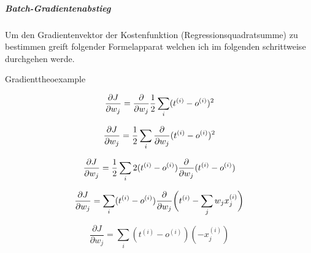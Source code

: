 \vspace{1cm}

\subparagraph{Batch-Gradientenabstieg}
Um den Gradientenvektor der Kostenfunktion (Regressionsquadratsumme) zu bestimmen greift folgender Formelapparat welchen ich im folgenden schrittweise durchgehen werde.

\vspace{2 mm}
\begin{minipage}{\textwidth}
\begin{myderivation}{Gradient}{theoexample} \label{deri:grad}

\begin{equation} \label{eq:gr1}
\frac{\partial J}{\partial w_j} = \frac{\partial }{\partial w_j} \frac{1}{2} \sum_i  (t^{(i)} - o^{(i)})^2 \\
\end{equation}

\begin{equation} \label{eq:gr2}
\frac{\partial J}{\partial w_j} = \frac{1}{2} \sum_i \frac{\partial }{\partial w_j} (t^{(i)} - o^{(i)})^2 \\
\end{equation}

\begin{equation} \label{eq:gr3}
\frac{\partial J}{\partial w_j} = \frac{1}{2} \sum_i 2 (t^{(i)} - o^{(i)}) \frac{\partial }{\partial w_j} (t^{(i)} - o^{(i)}) \\
\end{equation}

\begin{equation} \label{eq:gr4}
\frac{\partial J}{\partial w_j} = \sum_i (t^{(i)} - o^{(i)}) \frac{\partial }{\partial w_j} \bigg(t^{(i)} - \sum_j w_j x^{(i)}_{j}\bigg) \\
\end{equation}

\begin{equation} \label{eq:gr5}
\frac{\partial J}{\partial w_j} = \sum_i  (t^{(i)} - o^{(i)})(-x^{(i)}_{j})
\end{equation}

\end{myderivation}
\end{minipage}


